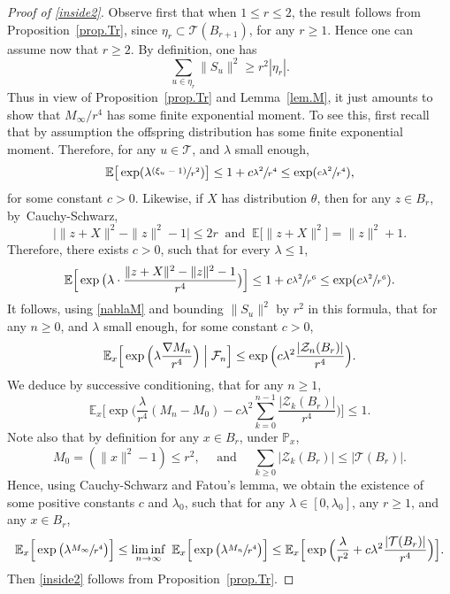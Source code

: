 \documentclass[JEP,XML,SOM,Unicode,NoFloatCountersInSection,published]{cedram}
\newcommand{\psfrac}[2]{\sfrac{(#1)}{#2}}
\let\ts\textstyle
\theoremstyle{plain}
\theoremstyle{definition}
\newcommand{\1}{{\text{\Large $\mathfrak 1$}}}
\begin{document}
\begin{proof}[Proof of \eqref{inside2}]
Observe first that when $1\le r\le 2$, the result follows from Proposition~\ref{prop.Tr}, since $\eta_r \subset \mathcal T(B_{r+1})$, for any $r\ge 1$. Hence one can assume now that $r\ge 2$.
By definition, one has
\[
\sum_{u\in \eta_r}\|S_u\|^2\ge r^2
|\eta_r|.
\]
Thus in view of Proposition~\ref{prop.Tr} and Lemma~\ref{lem.M},
it just amounts to show that $M_\infty/r^4$ has some finite exponential moment. To see this, first recall that by assumption the offspring distribution has some finite
exponential moment. Therefore, for any $u\in \mathbf {\mathcal T}$,
and $\lambda$ small enough,
\[
\mathbb E \big[\exp(\lambda \psfrac{\xi_u - 1}{r^2})\big] \le 1+ c\sfrac{\lambda^2}{r^4} \le \exp(\sfrac{c\lambda^2}{r^4}),
\]
for some constant $c>0$. Likewise, if $X$ has distribution $\theta$, then for any $z\in B_r$, by~Cauchy-Schwarz,
\[
\big|\|z+X\|^2 - \|z\|^2 - 1\big| \le 2r \ \text{ and }\ \mathbb E\big[\|z+X\|^2\big] = \|z\|^2 + 1.
\]
Therefore, there exists $c>0$, such that for every $\lambda\le 1$,
\[
\mathbb E \Big[\exp\big(\lambda\cdot \frac{\|z+X\|^2 - \|z\|^2 - 1}{r^4}\big)\Big] \le 1+ c\sfrac{\lambda^2}{r^6} \le \exp(c\sfrac{\lambda^2}{r^6}).
\]
It follows, using \eqref{nablaM} and bounding $\|S_u\|^2$ by $r^2$ in this formula,
that for any $n\ge 0$, and $\lambda$ small enough, for some constant $c>0$,
\[
\mathbb E_x\Big[\exp\Big(\lambda \frac{\nabla M_n}{r^4}\Big)
\Bigm|\mathcal F_n\Big] \le \exp\Big(c\lambda^2
\frac{|\mathcal Z_n(B_r)|}{r^4}\Big).
\]
We deduce by successive conditioning, that for any $n\ge 1$,
\[
\mathbb E_x\Big[\exp\Big(\frac{\lambda}{r^4}(M_n - M_0)
- c\lambda^2 {\ts\sum_{k= 0}^{n-1}} \frac{|\mathcal Z_k(B_r)|}{r^4}\Big)\Big] \le 1.
\]
Note also that by definition for any $x\in B_r$, under $\mathbb P_x$,
\[
M_0= (\|x\|^2-1) \le r^2,\quad
\text{ and }\quad \sum_{k\ge 0} |\mathcal Z_k(B_r)|\le |\mathcal T(B_r)|.
\]
Hence, using Cauchy-Schwarz and Fatou's lemma, we obtain the existence of some positive constants $c$ and $\lambda_0$, such that for any $\lambda\in[0,\lambda_0]$, any $r\ge 1$, and any $x\in B_r$,
\[
\mathbb E_x\Big[\exp\big(\lambda\sfrac{M_\infty}{r^4}\big)\Big]
\le \liminf_{n\to \infty} \ \mathbb E_x\Big[\exp\big(\lambda\sfrac{M_n}{r^4}\big)\Big]
\le \mathbb E_x\Big[\exp\Big(\frac{\lambda}{r^2}+
c\lambda^2\frac{|\mathcal T(B_r)|}{r^4}\Big)\Big].
\]
Then \eqref{inside2} follows from Proposition~\ref{prop.Tr}.
\end{proof}
\end{document}
